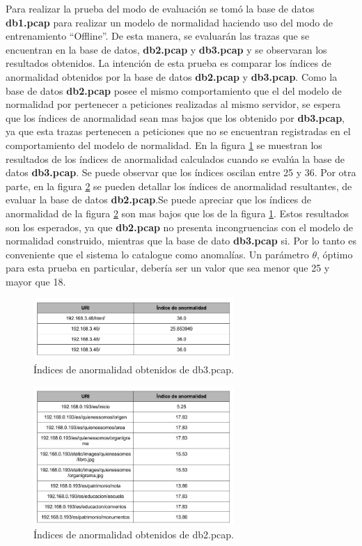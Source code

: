 Para realizar la prueba del modo de evaluación se tomó la base de datos
\textbf{db1.pcap} para realizar un modelo de normalidad haciendo uso del modo de entrenamiento ``Offline''. De esta manera, se evaluarán las trazas que se encuentran en la base de datos, \textbf{db2.pcap} y \textbf{db3.pcap} y se observaran los resultados obtenidos.
La intención de esta prueba es comparar los  índices de anormalidad
obtenidos por la base de datos \textbf{db2.pcap} y \textbf{db3.pcap}.
Como la base de datos \textbf{db2.pcap} posee el mismo comportamiento que
el del modelo de normalidad por pertenecer a peticiones realizadas al mismo servidor, se espera que los  índices de anormalidad sean mas bajos que los obtenido por \textbf{db3.pcap}, ya que esta trazas pertenecen a peticiones que no se encuentran registradas en el comportamiento del modelo de normalidad.
En la figura \ref{fig:indicesMalos} se muestran los resultados de los  índices de anormalidad calculados cuando se evalúa la base de datos \textbf{db3.pcap}.
Se puede observar que los índices oscilan entre 25 y 36.
Por otra parte, en la figura \ref{fig:indicesBuenos} se pueden detallar los índices de anormalidad resultantes, de evaluar la base de datos \textbf{db2.pcap}.Se puede apreciar que los índices de anormalidad de la figura \ref{fig:indicesBuenos} son mas bajos que los de la figura \ref{fig:indicesMalos}. Estos resultados son los esperados, ya que \textbf{db2.pcap} no presenta incongruencias con el modelo de normalidad construido, mientras que la base de dato \textbf{db3.pcap} si. Por lo tanto es conveniente que el sistema lo catalogue como anomalías.
Un parámetro $\theta$, óptimo para esta prueba en particular, debería ser un
valor que sea menor que 25 y mayor que 18.

\begin{figure}[!htb]
\begin{center}
\includegraphics[width=3in]{./img/indicesMalos.png}
\caption{Índices de anormalidad obtenidos de db3.pcap.}
\label{fig:indicesMalos}
\end{center}
\end{figure}

\begin{figure}[!htb]
\begin{center}
\includegraphics[width=3in]{./img/indicesBuenos.jpg}
\caption{Índices de anormalidad obtenidos de db2.pcap.}
\label{fig:indicesBuenos}
\end{center}
\end{figure}
